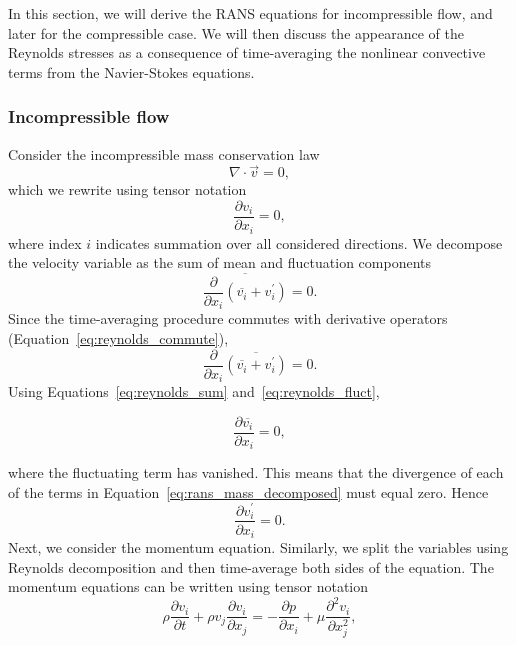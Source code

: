 In this section, we will derive the RANS equations for incompressible flow, and later for the compressible case. We will then discuss the appearance of the Reynolds stresses as a consequence of time-averaging the nonlinear convective terms from the Navier-Stokes equations.

\subsubsection{Incompressible flow}

Consider the incompressible mass conservation law
\begin{equation}
    \nabla\cdot\vec{v} = 0,
\end{equation}
which we rewrite using tensor notation
\begin{equation}
    \frac{\partial v_i}{\partial x_i} = 0,
\end{equation}
where index $i$ indicates summation over all considered directions. We decompose the velocity variable as the sum of mean and fluctuation components
\begin{equation}
    \overline{\frac{\partial }{\partial x_i}\left(\overline{v_i} + v_i^\prime\right)} = 0.
\end{equation}
Since the time-averaging procedure commutes with derivative operators (Equation~\ref{eq:reynolds_commute}),
\begin{equation}
    \label{eq:rans_mass_decomposed}
    \frac{\partial}{\partial x_i} \overline{\left(\overline{v_i} + v_i^\prime\right)} = 0.
\end{equation}
Using Equations~\ref{eq:reynolds_sum} and~\ref{eq:reynolds_fluct},
\begin{eqBox}
\begin{equation}
	\frac{\partial \overline{v_i}}{\partial x_i} = 0,
	\label{eq:rans_continuity}
\end{equation}
\end{eqBox}
where the fluctuating term has vanished. This means that the divergence of each of the terms in Equation~\ref{eq:rans_mass_decomposed} must equal zero. Hence
\begin{equation}
	\frac{\partial v_i^\prime}{\partial x_i} = 0.
	\label{eq:rans_continuity2}
\end{equation}
Next, we consider the momentum equation. Similarly, we split the variables using Reynolds decomposition and then time-average both sides of the equation. The momentum equations can be written using tensor notation
\begin{equation}
    \label{eq:rans_momentum_initial}
    \rho\frac{\partial v_i}{\partial t} + \rho v_j\frac{\partial v_i}{\partial x_j} =
    - \frac{\partial p}{\partial x_i} + \mu \frac{\partial^2 v_i}{\partial x_j^2},
\end{equation}
